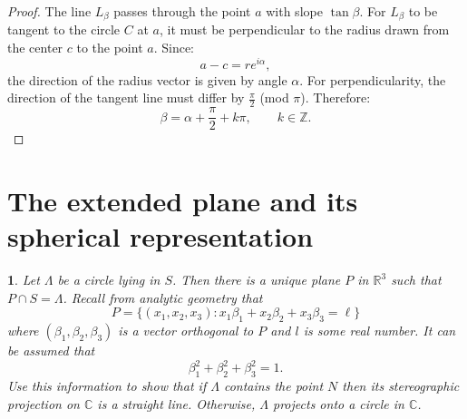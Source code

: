 \documentclass[12pt, a4paper]{report}
\theoremstyle{spaced}
\newtheorem{exercise}{}
\newcommand{\setexercise}[1]{\setcounter{exercise}{#1-1}}
\begin{document}
\begin{proof}
	The line $L_\beta$ passes through the point $a$ with slope $\tan\beta$.
	For $L_\beta$ to be tangent to the circle $C$ at $a$, it must be perpendicular to the radius drawn from the center $c$ to the point $a$.
	Since:
	\[
		a - c = r e^{i\alpha},
	\]
	the direction of the radius vector is given by angle $\alpha$.
	For perpendicularity, the direction of the tangent line must differ by $\tfrac{\pi}{2}$ (mod $\pi$).
	Therefore:
	\[
		\beta = \alpha + \frac{\pi}{2} + k\pi,
		\qquad k \in \mathbb{Z}.
	\]
\end{proof}

\section{The extended plane and its spherical representation}
\setexercise{4}
\begin{exercise}
	Let $\Lambda$ be a circle lying in $S$. Then there is a unique plane $P$ in $\mathbb{R}^3$ such that $P \cap S = \Lambda$.
	Recall from analytic geometry that
	\[
		P = \{ (x_1, x_2, x_3) : x_1 \beta_1 + x_2 \beta_2 + x_3 \beta_3 = \ell \}
	\]
	where $(\beta_1, \beta_2, \beta_3)$ is a vector orthogonal to $P$ and $l$ is some real number.
	It can be assumed that
	\[
		\beta_1^2 + \beta_2^2 + \beta_3^2 = 1.
	\]
	Use this information to show that if $\Lambda$ contains the point $N$ then its stereographic projection on $\mathbb{C}$ is a straight line.
	Otherwise, $\Lambda$ projects onto a circle in $\mathbb{C}$.
\end{exercise}
\end{document}
